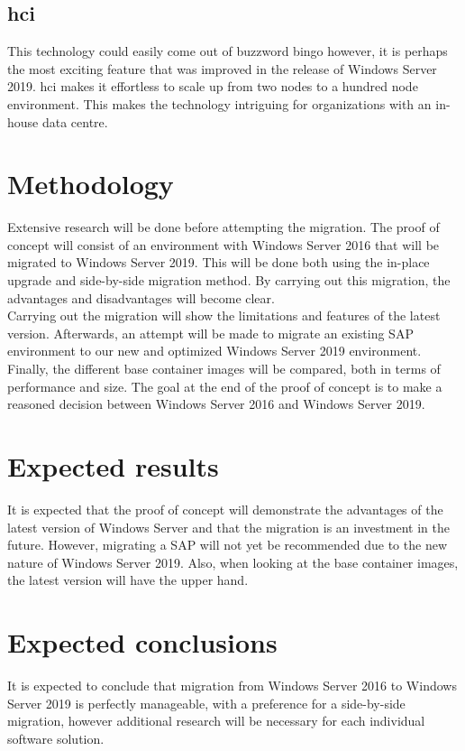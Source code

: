 \subsection{\acrfull{hci}}
This technology could easily come out of buzzword bingo however, it is perhaps the most exciting feature that was improved in the release of Windows Server 2019. 
\acrshort{hci} makes it effortless to scale up from two nodes to a hundred node environment. 
This makes the technology intriguing for organizations with an in-house data centre.
\section{Methodology}\label{sec:methodology}
Extensive research will be done before attempting the migration. The proof of concept will consist of an environment with Windows Server 2016 that will be migrated to Windows Server 2019. This will be done both using the in-place upgrade and side-by-side migration method. By carrying out this migration, the advantages and disadvantages will become clear. \\
Carrying out the migration will show the limitations and features of the latest version. 
Afterwards, an attempt will be made to migrate an existing SAP environment to our new and optimized Windows Server 2019 environment.\\
Finally, the different base container images will be compared, both in terms of performance and size. 
The goal at the end of the proof of concept is to make a reasoned decision between Windows Server 2016 and Windows Server 2019.
\section{Expected results}\label{sec:anticipated_results}
It is expected that the proof of concept will demonstrate the advantages of the latest version of Windows Server and that the migration is an investment in the future. 
However, migrating a SAP will not yet be recommended due to the new nature of Windows Server 2019. 
Also, when looking at the base container images, the latest version will have the upper hand. 
\section{Expected conclusions}\label{sec:anticipated_conclusions}
It is expected to conclude that migration from Windows Server 2016 to Windows Server 2019 is perfectly manageable, with a preference for a side-by-side migration, however additional research will be necessary for each individual software solution. 